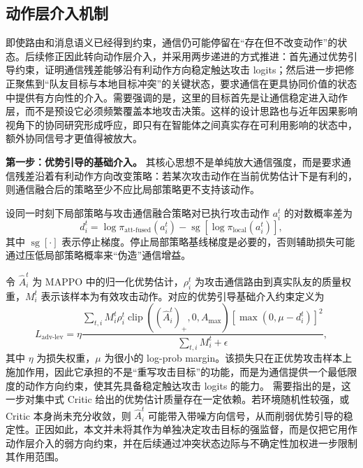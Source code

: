 \subsection{动作层介入机制}

即使路由和消息语义已经得到约束，通信仍可能停留在“存在但不改变动作”的状态。后续修正因此转向动作层介入，并采用两步递进的方式推进：首先通过优势引导约束，证明通信残差能够沿有利动作方向稳定触达攻击 logits；然后进一步把修正聚焦到“队友目标与本地目标冲突”的关键状态，要求通信在更具协同价值的状态中提供有方向性的介入。需要强调的是，这里的目标首先是让通信稳定进入动作层，而不是预设它必须频繁覆盖本地攻击决策。这样的设计思路也与近年因果影响视角下的协同研究形成呼应，即只有在智能体之间真实存在可利用影响的状态中，额外协同信号才更值得被放大\cite{du2024scic}。

\textbf{第一步：优势引导的基础介入。} 其核心思想不是单纯放大通信强度，而是要求通信残差沿着有利动作方向改变策略：若某次攻击动作在当前优势估计下是有利的，则通信融合后的策略至少不应比局部策略更不支持该动作。

设同一时刻下局部策略与攻击通信融合策略对已执行攻击动作 $a_i^t$ 的对数概率差为
\begin{equation}
d_i^t =
\log \pi_{\text{att-fused}}(a_i^t)
-
\operatorname{sg}\!\left[
\log \pi_{\text{local}}(a_i^t)
\right],
\end{equation}
其中 $\operatorname{sg}[\cdot]$ 表示停止梯度。停止局部策略基线梯度是必要的，否则辅助损失可能通过压低局部策略概率来“伪造”通信增益。

令 $\hat{A}_i^t$ 为 MAPPO 中的归一化优势估计，$\rho_i^t$ 为攻击通信路由到真实队友的质量权重，$M_i^t$ 表示该样本为有效攻击动作。对应的优势引导基础介入约束定义为
\begin{equation}
L_{\text{adv-lev}}
=
\eta
\frac{
\sum_{t,i}
M_i^t \rho_i^t
\operatorname{clip}((\hat{A}_i^t)_+,0,A_{\max})
\left[
\max(0,\mu-d_i^t)
\right]^2
}{
\sum_{t,i}M_i^t + \epsilon
},
\end{equation}
其中 $\eta$ 为损失权重，$\mu$ 为很小的 log-prob margin。该损失只在正优势攻击样本上施加作用，因此它承担的不是“重写攻击目标”的功能，而是为通信提供一个最低限度的动作方向约束，使其先具备稳定触达攻击 logits 的能力。
需要指出的是，这一步对集中式 Critic 给出的优势估计质量存在一定依赖。若环境随机性较强，或 Critic 本身尚未充分收敛，则 \(\hat{A}_i^t\) 可能带入带噪方向信号，从而削弱优势引导的稳定性。正因如此，本文并未将其作为单独决定攻击目标的强监督，而是仅把它用作动作层介入的弱方向约束，并在后续通过冲突状态边际与不确定性加权进一步限制其作用范围。

